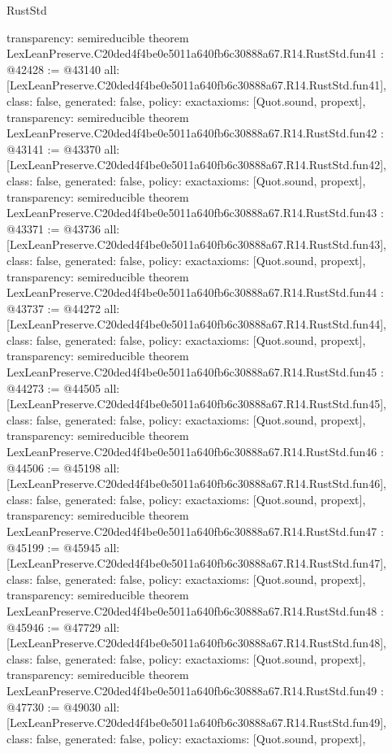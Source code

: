 \begin{lexlean}{RustStd}
\begin{coremodule}
{  transparency: semireducible
}
theorem LexLeanPreserve.C20ded4f4be0e5011a640fb6c30888a67.R14.RustStd.fun41 : @42428 := @43140 {
  all: [LexLeanPreserve.C20ded4f4be0e5011a640fb6c30888a67.R14.RustStd.fun41],
  class: false,
  generated: false,
  policy: exact{axioms: [Quot.sound, propext]},
  transparency: semireducible
}
theorem LexLeanPreserve.C20ded4f4be0e5011a640fb6c30888a67.R14.RustStd.fun42 : @43141 := @43370 {
  all: [LexLeanPreserve.C20ded4f4be0e5011a640fb6c30888a67.R14.RustStd.fun42],
  class: false,
  generated: false,
  policy: exact{axioms: [Quot.sound, propext]},
  transparency: semireducible
}
theorem LexLeanPreserve.C20ded4f4be0e5011a640fb6c30888a67.R14.RustStd.fun43 : @43371 := @43736 {
  all: [LexLeanPreserve.C20ded4f4be0e5011a640fb6c30888a67.R14.RustStd.fun43],
  class: false,
  generated: false,
  policy: exact{axioms: [Quot.sound, propext]},
  transparency: semireducible
}
theorem LexLeanPreserve.C20ded4f4be0e5011a640fb6c30888a67.R14.RustStd.fun44 : @43737 := @44272 {
  all: [LexLeanPreserve.C20ded4f4be0e5011a640fb6c30888a67.R14.RustStd.fun44],
  class: false,
  generated: false,
  policy: exact{axioms: [Quot.sound, propext]},
  transparency: semireducible
}
theorem LexLeanPreserve.C20ded4f4be0e5011a640fb6c30888a67.R14.RustStd.fun45 : @44273 := @44505 {
  all: [LexLeanPreserve.C20ded4f4be0e5011a640fb6c30888a67.R14.RustStd.fun45],
  class: false,
  generated: false,
  policy: exact{axioms: [Quot.sound, propext]},
  transparency: semireducible
}
theorem LexLeanPreserve.C20ded4f4be0e5011a640fb6c30888a67.R14.RustStd.fun46 : @44506 := @45198 {
  all: [LexLeanPreserve.C20ded4f4be0e5011a640fb6c30888a67.R14.RustStd.fun46],
  class: false,
  generated: false,
  policy: exact{axioms: [Quot.sound, propext]},
  transparency: semireducible
}
theorem LexLeanPreserve.C20ded4f4be0e5011a640fb6c30888a67.R14.RustStd.fun47 : @45199 := @45945 {
  all: [LexLeanPreserve.C20ded4f4be0e5011a640fb6c30888a67.R14.RustStd.fun47],
  class: false,
  generated: false,
  policy: exact{axioms: [Quot.sound, propext]},
  transparency: semireducible
}
theorem LexLeanPreserve.C20ded4f4be0e5011a640fb6c30888a67.R14.RustStd.fun48 : @45946 := @47729 {
  all: [LexLeanPreserve.C20ded4f4be0e5011a640fb6c30888a67.R14.RustStd.fun48],
  class: false,
  generated: false,
  policy: exact{axioms: [Quot.sound, propext]},
  transparency: semireducible
}
theorem LexLeanPreserve.C20ded4f4be0e5011a640fb6c30888a67.R14.RustStd.fun49 : @47730 := @49030 {
  all: [LexLeanPreserve.C20ded4f4be0e5011a640fb6c30888a67.R14.RustStd.fun49],
  class: false,
  generated: false,
  policy: exact{axioms: [Quot.sound, propext]},
}
\end{coremodule}
\end{lexlean}
